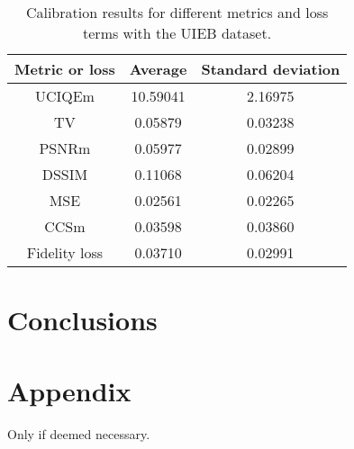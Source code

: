 \documentclass[twocolumn,twoside,a4paper,10pt]{IEEEtran}
\begin{document}
\begin{table}[h]
\centering
\caption{Calibration results for different metrics and loss terms with the UIEB dataset.}
\begin{tabular}{|c|c|c|}
\hline
\textbf{Metric or loss} & \textbf{Average} & \textbf{Standard deviation} \\ \hline
UCIQEm                  & 10.59041         & 2.16975                     \\ \hline
TV                      & 0.05879          & 0.03238                     \\ \hline
PSNRm                   & 0.05977          & 0.02899                     \\ \hline
DSSIM                   & 0.11068          & 0.06204                     \\ \hline
MSE                     & 0.02561          & 0.02265                     \\ \hline
CCSm                    & 0.03598          & 0.03860                     \\ \hline
Fidelity loss           & 0.03710          & 0.02991                     \\ \hline
\end{tabular}
\end{table}


\section{Conclusions}

\section{Appendix}

Only if deemed necessary.


\end{document}
